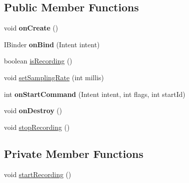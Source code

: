 \subsection*{Public Member Functions}
\begin{DoxyCompactItemize}
\item 
\hypertarget{classcom_1_1qualoutdoor_1_1recorder_1_1recording_1_1RecordingService_a2e48946d240d2e6fcc41d4046b618321}{void {\bfseries on\-Create} ()}\label{classcom_1_1qualoutdoor_1_1recorder_1_1recording_1_1RecordingService_a2e48946d240d2e6fcc41d4046b618321}

\item 
\hypertarget{classcom_1_1qualoutdoor_1_1recorder_1_1recording_1_1RecordingService_a7ab6dab80edc8e3ad2b5a7436534d7f6}{I\-Binder {\bfseries on\-Bind} (Intent intent)}\label{classcom_1_1qualoutdoor_1_1recorder_1_1recording_1_1RecordingService_a7ab6dab80edc8e3ad2b5a7436534d7f6}

\item 
boolean \hyperlink{classcom_1_1qualoutdoor_1_1recorder_1_1recording_1_1RecordingService_a97c5a5525e4f024ed981f8a4167c0c8f}{is\-Recording} ()
\item 
void \hyperlink{classcom_1_1qualoutdoor_1_1recorder_1_1recording_1_1RecordingService_a7a2a7a176fba147bbc3eb753aa819513}{set\-Sampling\-Rate} (int millis)
\item 
\hypertarget{classcom_1_1qualoutdoor_1_1recorder_1_1recording_1_1RecordingService_a9614d87abfd09a76f082d5c37cf06de2}{int {\bfseries on\-Start\-Command} (Intent intent, int flags, int start\-Id)}\label{classcom_1_1qualoutdoor_1_1recorder_1_1recording_1_1RecordingService_a9614d87abfd09a76f082d5c37cf06de2}

\item 
\hypertarget{classcom_1_1qualoutdoor_1_1recorder_1_1recording_1_1RecordingService_ad97856ad8728cbbc102e664b934982bc}{void {\bfseries on\-Destroy} ()}\label{classcom_1_1qualoutdoor_1_1recorder_1_1recording_1_1RecordingService_ad97856ad8728cbbc102e664b934982bc}

\item 
void \hyperlink{classcom_1_1qualoutdoor_1_1recorder_1_1recording_1_1RecordingService_a51bcaacd57cecbbc192ae10ee0548898}{stop\-Recording} ()
\end{DoxyCompactItemize}
\subsection*{Private Member Functions}
\begin{DoxyCompactItemize}
\item 
void \hyperlink{classcom_1_1qualoutdoor_1_1recorder_1_1recording_1_1RecordingService_ad1e000af998ea34d8cd646c73b38f12a}{start\-Recording} ()
\end{DoxyCompactItemize}
